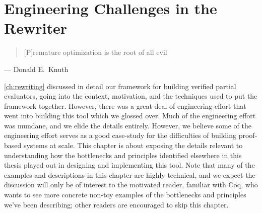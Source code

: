 \chapter{%
  Engineering Challenges in the Rewriter%
}\label{ch:rewriting-more}
%

\begin{quote}
  [P]remature optimization is the root of all evil
\end{quote}
\begin{flushright}
  --- Donald E.~Knuth~\cite[p.~671]{KnuthPrematureOptimization}
\end{flushright}

\vspace{2\baselineskip}

\autoref{ch:rewriting} discussed in detail our framework for building verified partial evaluators, going into the context, motivation, and the techniques used to put the framework together.
However, there was a great deal of engineering effort that went into building this tool which we glossed over.
Much of the engineering effort was mundane, and we elide the details entirely.
However, we believe some of the engineering effort serves as a good case-study for the difficulties of building proof-based systems at scale.
This chapter is about exposing the details relevant to understanding how the bottlenecks and principles identified elsewhere in this thesis played out in designing and implementing this tool.
Note that many of the examples and descriptions in this chapter are highly technical, and we expect the discussion will only be of interest to the motivated reader, familiar with Coq, who wants to see more concrete non-toy examples of the bottlenecks and principles we've been describing; other readers are encouraged to skip this chapter.


